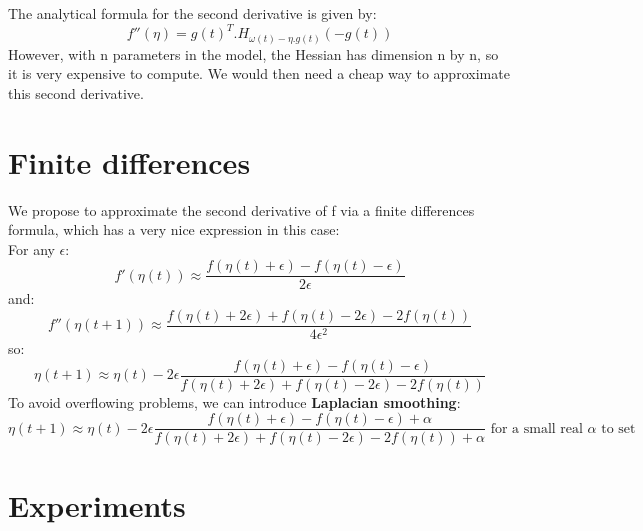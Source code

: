\documentclass[]{article}
\begin{document}
The analytical formula for the second derivative is given by:\\
\begin{equation}
f''(\eta) = g(t)^{T}.H_{\omega(t)-\eta.g(t)}(-g(t))
\end{equation}
However, with n parameters in the model, the Hessian has dimension n by n, so it is very expensive to compute. We would then need a cheap way to approximate this second derivative. 

\section{Finite differences}
We propose to approximate the second derivative of f via a finite differences formula, which has a very nice expression in this case:\\
For any $\epsilon$:\\
\begin{equation}
f'(\eta(t)) \approx \frac{f(\eta(t)+\epsilon)-f(\eta(t)-\epsilon)}{2\epsilon}
\end{equation}
and:\\
\begin{equation}
f''(\eta(t+1)) \approx \frac{f(\eta(t)+2\epsilon)+f(\eta(t)-2\epsilon)-2f(\eta(t))}{4\epsilon^{2}}
\end{equation}
so:\\
\begin{equation}
\eta(t+1) \approx \eta(t) -2\epsilon\frac{f(\eta(t)+\epsilon)-f(\eta(t)-\epsilon)}{f(\eta(t)+2\epsilon)+f(\eta(t)-2\epsilon)-2f(\eta(t))}
\end{equation}
To avoid overflowing problems, we can introduce \textbf{Laplacian smoothing}:
\begin{equation}
\eta(t+1) \approx \eta(t) -2\epsilon\frac{f(\eta(t)+\epsilon)-f(\eta(t)-\epsilon) + \alpha}{f(\eta(t)+2\epsilon)+f(\eta(t)-2\epsilon)-2f(\eta(t)) + \alpha} \text{ for a small real $\alpha$ to set}
\end{equation}


\section{Experiments}
\end{document}
